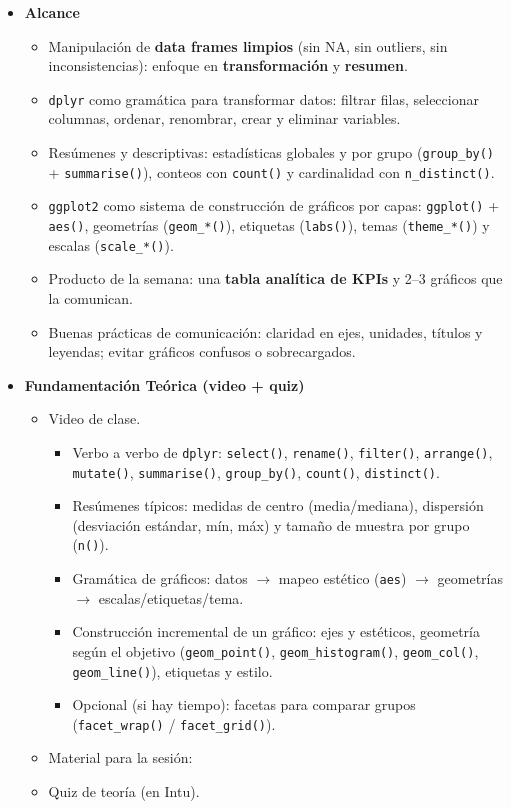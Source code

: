 \documentclass{article}
\begin{document}
\begin{itemize}
\item \textbf{Alcance}
\begin{itemize}
  \item Manipulación de \textbf{data frames limpios} (sin NA, sin outliers, sin inconsistencias): enfoque en \textbf{transformación} y \textbf{resumen}.
  \item \texttt{dplyr} como gramática para transformar datos: filtrar filas, seleccionar columnas, ordenar, renombrar, crear y eliminar variables.
  \item Resúmenes y descriptivas: estadísticas globales y por grupo (\texttt{group\_by()} + \texttt{summarise()}), conteos con \texttt{count()} y cardinalidad con \texttt{n\_distinct()}.
  \item \texttt{ggplot2} como sistema de construcción de gráficos por capas: \texttt{ggplot()} + \texttt{aes()}, geometrías (\texttt{geom\_*()}), etiquetas (\texttt{labs()}), temas (\texttt{theme\_*()}) y escalas (\texttt{scale\_*()}).
  \item Producto de la semana: una \textbf{tabla analítica de KPIs} y 2--3 gráficos que la comunican.
  \item Buenas prácticas de comunicación: claridad en ejes, unidades, títulos y leyendas; evitar gráficos confusos o sobrecargados.
\end{itemize}

\item \textbf{Fundamentación Teórica (video + quiz)}
\begin{itemize}
  \item Video de clase. %
  \begin{itemize}
    \item Verbo a verbo de \texttt{dplyr}: \texttt{select()}, \texttt{rename()}, \texttt{filter()}, \texttt{arrange()}, \texttt{mutate()}, \texttt{summarise()}, \texttt{group\_by()}, \texttt{count()}, \texttt{distinct()}.
    \item Resúmenes típicos: medidas de centro (media/mediana), dispersión (desviación estándar, mín, máx) y tamaño de muestra por grupo (\texttt{n()}).
    \item Gramática de gráficos: datos $\rightarrow$ mapeo estético (\texttt{aes}) $\rightarrow$ geometrías $\rightarrow$ escalas/etiquetas/tema.
    \item Construcción incremental de un gráfico: ejes y estéticos, geometría según el objetivo (\texttt{geom\_point()}, \texttt{geom\_histogram()}, \texttt{geom\_col()}, \texttt{geom\_line()}), etiquetas y estilo.
    \item Opcional (si hay tiempo): facetas para comparar grupos (\texttt{facet\_wrap()} / \texttt{facet\_grid()}).
  \end{itemize}
  \item Material para la sesión: %
  \item Quiz de teoría (en Intu).
\end{itemize}


\end{itemize}
\end{document}
